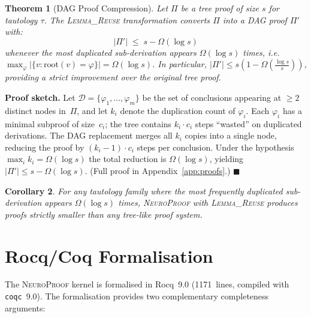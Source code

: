 \documentclass[conference]{IEEEtran}
\newtheorem{theorem}{Theorem}[section]
\newtheorem{corollary}[theorem]{Corollary}
\newenvironment{proof}[1][Proof]{\textbf{#1.} }{\hfill$\blacksquare$}
\newcommand{\NP}{\textsc{NeuroProof}}
\begin{document}
\begin{theorem}[DAG Proof Compression]
  \label{thm:proof-size}
  Let $\Pi$ be a tree proof of size $s$ for tautology $\tau$.
  The   \textsc{Lemma\_Reuse} transformation converts $\Pi$ into a
  DAG proof $\Pi'$ with:
  \begin{equation}
    |\Pi'| \;\leq\; s - \Omega(\log s)
  \end{equation}
  whenever the most duplicated sub-derivation appears
  $\Omega(\log s)$ times, i.e.\
  $\max_{\varphi} |\{v : \mathrm{root}(v) = \varphi\}| = \Omega(\log s)$.
  In particular, $|\Pi'| \leq s(1 - \Omega(\tfrac{\log s}{s}))$,
  providing a \emph{strict} improvement over the original tree proof.
\end{theorem}
\begin{proof}[Proof sketch]
  Let $\mathcal{D} = \{\varphi_1, \ldots, \varphi_m\}$ be the set of
  conclusions appearing at $\geq 2$ distinct nodes in~$\Pi$, and let
  $k_i$ denote the duplication count of $\varphi_i$.  Each
  $\varphi_i$ has a minimal subproof of size~$c_i$; the tree contains
  $k_i \cdot c_i$ steps ``wasted'' on duplicated derivations.
  The DAG replacement merges all $k_i$ copies into a single node,
  reducing the proof by $(k_i-1) \cdot c_i$ steps per conclusion.
  Under the hypothesis
  $\max_i k_i = \Omega(\log s)$ the total reduction is
  $\Omega(\log s)$, yielding
  $|\Pi'| \leq s - \Omega(\log s)$.
  (Full proof in Appendix~\ref{app:proofs}.)
\end{proof}

\begin{corollary}
  For any tautology family where the most frequently duplicated
  sub-derivation appears $\Omega(\log s)$ times, \NP{} with
  \textsc{Lemma\_Reuse} produces proofs \emph{strictly smaller} than
  any tree-like proof system.
\end{corollary}

\section{Rocq/Coq Formalisation}
\label{sec:rocq}

The \NP{} kernel is formalised in Rocq~9.0 (1171~lines, compiled
with \texttt{coqc}~9.0).  The formalisation provides two complementary
completeness arguments:
\end{document}
